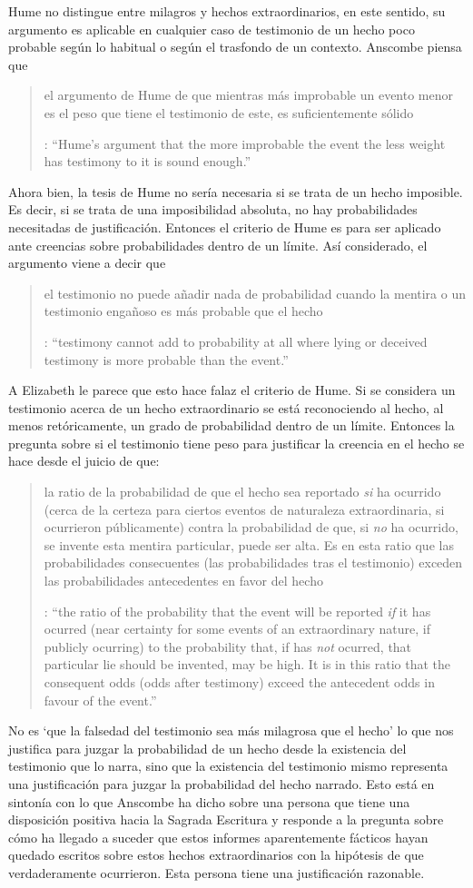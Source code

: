 Hume no distingue entre milagros y hechos extraordinarios, en este sentido, su argumento es aplicable en cualquier caso de testimonio de un hecho poco probable según lo habitual o según el trasfondo de un contexto. Anscombe piensa que \blockquote[{\cite[47]{anscombe2008faith:hummi}}: \enquote{Hume's argument that the more improbable the event the less weight has testimony to it is sound enough.}]{el argumento de Hume de que mientras más improbable un evento menor es el peso que tiene el testimonio de este, es suficientemente sólido}. Ahora bien, la tesis de Hume no sería necesaria si se trata de un hecho imposible. Es decir, si se trata de una imposibilidad absoluta, no hay probabilidades necesitadas de justificación. Entonces el criterio de Hume es para ser aplicado ante creencias sobre probabilidades dentro de un límite. Así considerado, el argumento viene a decir que \blockquote[{\cite[47]{anscombe2008faith:hummi}}: \enquote{testimony cannot add to probability at all where lying or deceived testimony is more probable than the event.}]{el testimonio no puede añadir nada de probabilidad cuando la mentira o un testimonio engañoso es más probable que el hecho}. A Elizabeth le parece que esto hace falaz el criterio de Hume. Si se considera un testimonio acerca de un hecho extraordinario se está reconociendo al hecho, al menos retóricamente, un grado de probabilidad dentro de un límite. Entonces la pregunta sobre si el testimonio tiene peso para justificar la creencia en el hecho se hace desde el juicio de que: \blockquote[{\cite[47]{anscombe2008faith:hummi}}: \enquote{the ratio of the probability that the event will be reported \emph{if} it has ocurred (near certainty for some events of an extraordinary nature, if publicly ocurring) to the probability that, if has \emph{not} ocurred, that particular lie should be invented, may be high. It is in this ratio that the consequent odds (odds after testimony) exceed the antecedent odds in favour of the event.}]{la ratio de la probabilidad de que el hecho sea reportado \emph{si} ha ocurrido (cerca de la certeza para ciertos eventos de naturaleza extraordinaria, si ocurrieron públicamente) contra la probabilidad de que, si \emph{no} ha ocurrido, se invente esta mentira particular, puede ser alta. Es en esta ratio que las probabilidades consecuentes (las probabilidades tras el testimonio) exceden las probabilidades antecedentes en favor del hecho}. No es \enquote*{que la falsedad del testimonio sea más milagrosa que el hecho} lo que nos justifica para juzgar la probabilidad de un hecho desde la existencia del testimonio que lo narra, sino que la existencia del testimonio mismo representa una justificación para juzgar la probabilidad del hecho narrado. Esto está en sintonía con lo que Anscombe ha dicho sobre una persona que tiene una disposición positiva hacia la Sagrada Escritura y responde a la pregunta sobre cómo ha llegado a suceder que estos informes aparentemente fácticos hayan quedado escritos sobre estos hechos extraordinarios con la hipótesis de que verdaderamente ocurrieron. Esta persona tiene una justificación razonable.
